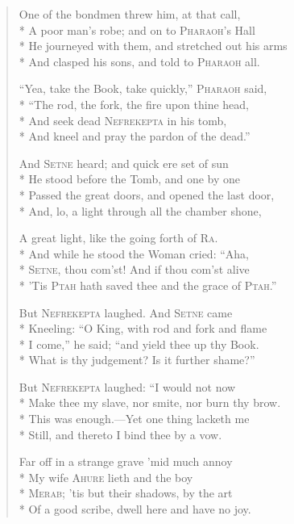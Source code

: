 \documentclass[12pt]{article}
\newcommand{\vin}{\hspace{1em}}
\begin{document}
\begin{verse}
One of the bondmen threw him, at that call,\\*
A poor man's robe; and on to \textsc{Pharaoh}'s Hall\\*
\vin He journeyed with them, and stretched out his arms\\*
And clasped his sons, and told to \textsc{Pharaoh} all.

``Yea, take the Book, take quickly,'' \textsc{Pharaoh} said,\\*
``The rod, the fork, the fire upon thine head,\\*
\vin And seek dead \textsc{Nefrekepta} in his tomb,\\*
And kneel and pray the pardon of the dead.''

And \textsc{Setne} heard; and quick ere set of sun\\*
He stood before the Tomb, and one by one\\*
\vin Passed the great doors, and opened the last door,\\*
And, lo, a light through all the chamber shone,

A great light, like the going forth of \textsc{Ra}.\\*
And while he stood the Woman cried: ``Aha,\\*
\vin \textsc{Setne}, thou com'st! And if thou com'st alive\\*
'Tis \textsc{Ptah} hath saved thee and the grace of \textsc{Ptah}.''

But \textsc{Nefrekepta} laughed. And \textsc{Setne} came\\*
Kneeling: ``O King, with rod and fork and flame\\*
\vin I come,'' he said; ``and yield thee up thy Book.\\*
What is thy judgement? Is it further shame?''

But \textsc{Nefrekepta} laughed: ``I would not now\\*
Make thee my slave, nor smite, nor burn thy brow.\\*
\vin This was enough.---Yet one thing lacketh me\\*
Still, and thereto I bind thee by a vow.

Far off in a strange grave 'mid much annoy\\*
My wife \textsc{Ahure} lieth and the boy\\*
\vin \textsc{Merab}; 'tis but their shadows, by the art\\*
Of a good scribe, dwell here and have no joy.


\end{verse}
\end{document}
